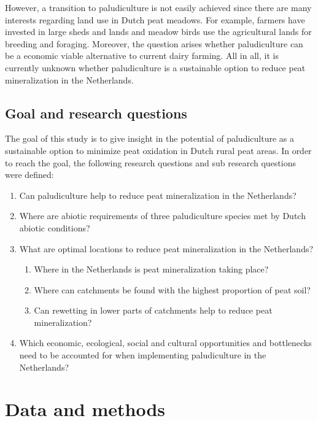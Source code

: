 \documentclass[a4paper,12pt]{scrbook}
\begin{document}
However, a transition to paludiculture is not easily achieved since there are many interests regarding land use in Dutch peat meadows. For example, farmers have invested in large sheds and lands and meadow birds use the agricultural lands for breeding and foraging. Moreover, the question arises whether paludiculture can be a economic viable alternative to current dairy farming. All in all, it is currently unknown whether paludiculture is a sustainable option to reduce peat mineralization in the Netherlands. 

\section{Goal and research questions}
The goal of this study is to give insight in the potential of paludiculture as a sustainable option to minimize peat oxidation in Dutch rural peat areas. In order to reach the goal, the following research questions and sub research questions were defined:

\begin{enumerate}
\item \label{rq:pallit} {Can paludiculture help to reduce peat mineralization in the Netherlands?}
\item \label{rq:abiot} {Where are abiotic requirements of three paludiculture species met by Dutch abiotic conditions?}
\item \label{rq:gisoptloc} {What are optimal locations to reduce peat mineralization in the Netherlands?}
\begin{enumerate}
\item \label{rqsub:peatmineral} {Where in the Netherlands is peat mineralization taking place?}
\item \label{rqsub:catchpeat} {Where can catchments be found with the highest proportion of peat soil?}
\item \label{rqsub:catchheigth} {Can rewetting in lower parts of catchments help to reduce peat mineralization?}
\end{enumerate}
\label{rq:sust}\item{Which economic, ecological, social and cultural opportunities and bottlenecks need to be accounted for when implementing paludiculture in the Netherlands?}
\end{enumerate}

\chapter{Data and methods}
\end{document}
